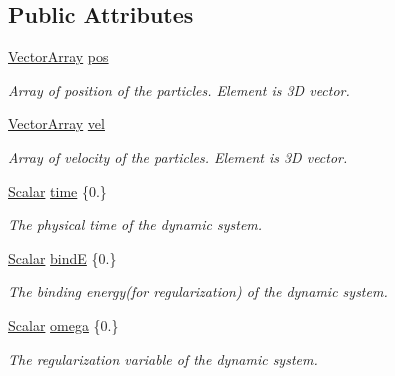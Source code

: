 \subsection*{Public Attributes}
\begin{DoxyCompactItemize}
\item 
\mbox{\hyperlink{classregu_dynamics_a86a05253d927e1716f3401e887aa5c8e}{Vector\+Array}} \mbox{\hyperlink{classregu_dynamics_a5e39085954d2dd9bcaa545a00880f442}{pos}}
\begin{DoxyCompactList}\small\item\em Array of position of the particles. Element is 3D vector. \end{DoxyCompactList}\item 
\mbox{\hyperlink{classregu_dynamics_a86a05253d927e1716f3401e887aa5c8e}{Vector\+Array}} \mbox{\hyperlink{classregu_dynamics_abf1176124ddfd429310f804491239801}{vel}}
\begin{DoxyCompactList}\small\item\em Array of velocity of the particles. Element is 3D vector. \end{DoxyCompactList}\item 
\mbox{\hyperlink{classregu_dynamics_a359c55370b4dee032396f0df86ad5fab}{Scalar}} \mbox{\hyperlink{classregu_dynamics_a05e287cf3f87cba248f69b5ff97a054d}{time}} \{0.\}
\begin{DoxyCompactList}\small\item\em The physical time of the dynamic system. \end{DoxyCompactList}\item 
\mbox{\hyperlink{classregu_dynamics_a359c55370b4dee032396f0df86ad5fab}{Scalar}} \mbox{\hyperlink{classregu_dynamics_a7e2b804745638810d38ed547487c26f2}{bindE}} \{0.\}
\begin{DoxyCompactList}\small\item\em The binding energy(for regularization) of the dynamic system. \end{DoxyCompactList}\item 
\mbox{\hyperlink{classregu_dynamics_a359c55370b4dee032396f0df86ad5fab}{Scalar}} \mbox{\hyperlink{classregu_dynamics_afef2a874c21e951765e50a497a411eae}{omega}} \{0.\}
\begin{DoxyCompactList}\small\item\em The regularization variable of the dynamic system. \end{DoxyCompactList}\end{DoxyCompactItemize}


